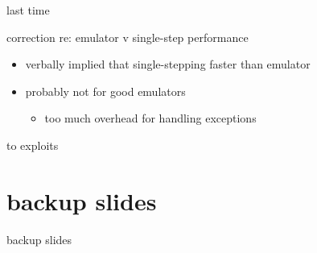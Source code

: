 \date{}
\title{}
\date{}

\begin{frame}
    \titlepage
\end{frame}


\usetikzlibrary{arrows.meta}
\begin{frame}{last time}
\end{frame}

\begin{frame}{correction re: emulator v single-step performance}
    \begin{itemize}
    \item verbally implied that single-stepping faster than emulator
    \item probably not for good emulators
        \begin{itemize}
        \item too much overhead for handling exceptions
        \end{itemize}
    \end{itemize}
\end{frame}

\begin{frame}{to exploits}
\end{frame}







\section{backup slides}
\begin{frame}{backup slides}
\end{frame}




